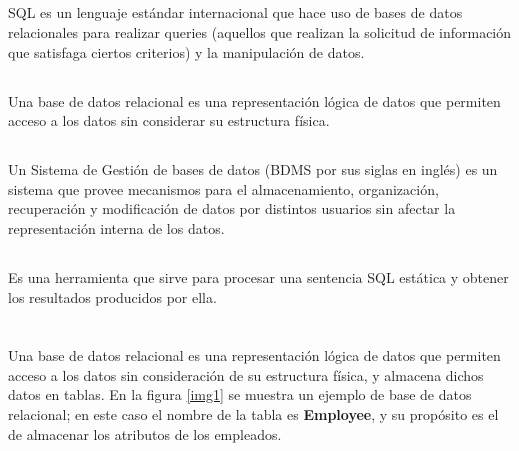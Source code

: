 \documentclass[10pt,a4paper]{article} %
\begin{document}
	\subsection{ \color{colorESCOM}{SQL}}
	{\large SQL es un lenguaje est{\' a}ndar internacional que hace uso de bases de datos relacionales para realizar queries (aquellos que realizan la solicitud de informaci{\' o}n que satisfaga ciertos criterios) y la manipulaci{\' o}n de datos.}
	
	\subsection{ \color{colorESCOM}{Base de Datos Relacional}}
	{\large Una base de datos relacional es una representaci{\' o}n l{\' o}gica de datos que permiten acceso a los datos sin considerar su estructura f{\' i}sica.}
	
	\subsection{ }
	{\large Un Sistema de Gesti{\' o}n de bases de datos (BDMS por sus siglas en ingl{\' e}s) es un sistema que provee mecanismos para el almacenamiento, organizaci{\' o}n, recuperaci{\' o}n y modificaci{\' o}n de datos por distintos usuarios sin afectar la representaci{\' o}n interna de los datos.}
	
	\subsection{ \color{colorESCOM}{Statement(sentencia)}}
	{\large Es una herramienta que sirve para procesar una sentencia SQL est{\' a}tica y obtener los resultados producidos por ella.}
	
	\pagebreak
	
	\section{\color{colorIPN}{Desarrollo}}
	{\large Una base de datos relacional es una representaci{\' o}n l{\' o}gica de datos que permiten acceso a los datos sin consideraci{\' o}n de su estructura f{\' i}sica, y almacena dichos datos en tablas. En la figura \ref{img1} se muestra un ejemplo de base de datos relacional; en este caso el nombre de la tabla es \textbf{Employee}, y su prop{\' o}sito es el de almacenar los atributos de los empleados.}
	
\end{document}
